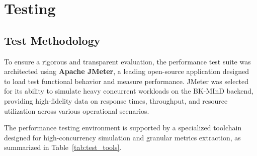\newpage

\section{Testing}

\subsection{Test Methodology}

To ensure a rigorous and transparent evaluation, the performance test suite was architected using \textbf{Apache JMeter}, a leading open-source application designed to load test functional behavior and measure performance. JMeter was selected for its ability to simulate heavy concurrent workloads on the BK-MInD backend, providing high-fidelity data on response times, throughput, and resource utilization across various operational scenarios.

The performance testing environment is supported by a specialized toolchain designed for high-concurrency simulation and granular metrics extraction, as summarized in Table~\ref{tab:test_tools}.

\begin{table}[H]
    \centering
    \caption{Performance Testing Toolchain.}
    \label{tab:test_tools}
\end{table}

